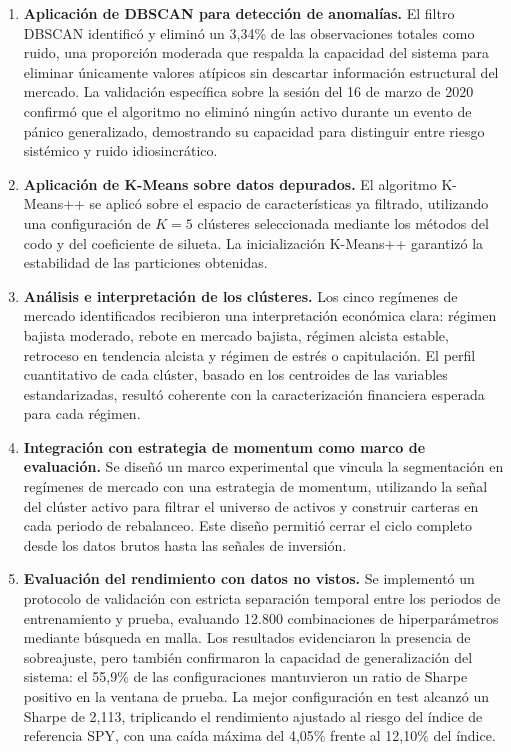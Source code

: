 \begin{enumerate}
    \item \textbf{Aplicación de DBSCAN para detección de anomalías.} 
    El filtro DBSCAN identificó y eliminó un 3,34\% de las 
    observaciones totales como ruido, una proporción moderada que 
    respalda la capacidad del sistema para eliminar únicamente valores 
    atípicos sin descartar información estructural del mercado. La 
    validación específica sobre la sesión del 16 de marzo de 2020 
    confirmó que el algoritmo no eliminó ningún activo durante un 
    evento de pánico generalizado, demostrando su capacidad para 
    distinguir entre riesgo sistémico y ruido idiosincrático.

    \item \textbf{Aplicación de K-Means sobre datos depurados.} El 
    algoritmo K-Means++ se aplicó sobre el espacio de características 
    ya filtrado, utilizando una configuración de $K=5$ clústeres 
    seleccionada mediante los métodos del codo y del coeficiente de 
    silueta. La inicialización K-Means++ garantizó la estabilidad de 
    las particiones obtenidas.

    \item \textbf{Análisis e interpretación de los clústeres.} Los 
    cinco regímenes de mercado identificados recibieron una 
    interpretación económica clara: régimen bajista moderado, rebote en 
    mercado bajista, régimen alcista estable, retroceso en tendencia 
    alcista y régimen de estrés o capitulación. El perfil cuantitativo 
    de cada clúster, basado en los centroides de las variables 
    estandarizadas, resultó coherente con la caracterización financiera 
    esperada para cada régimen.

    \item \textbf{Integración con estrategia de momentum como marco de 
    evaluación.} Se diseñó un marco experimental que vincula la 
    segmentación en regímenes de mercado con una estrategia de 
    momentum, utilizando la señal del clúster activo para filtrar el 
    universo de activos y construir carteras en cada periodo de 
    rebalanceo. Este diseño permitió cerrar el ciclo completo desde los 
    datos brutos hasta las señales de inversión.

    \item \textbf{Evaluación del rendimiento con datos no vistos.} Se 
    implementó un protocolo de validación con estricta separación 
    temporal entre los periodos de entrenamiento y prueba, evaluando 
    12.800 combinaciones de hiperparámetros mediante búsqueda en malla. 
    Los resultados evidenciaron la presencia de sobreajuste, pero 
    también confirmaron la capacidad de generalización del sistema: el 
    55,9\% de las configuraciones mantuvieron un ratio de Sharpe 
    positivo en la ventana de prueba. La mejor configuración en test 
    alcanzó un Sharpe de 2,113, triplicando el rendimiento ajustado al 
    riesgo del índice de referencia SPY, con una caída máxima del 
    4,05\% frente al 12,10\% del índice.


\end{enumerate}
